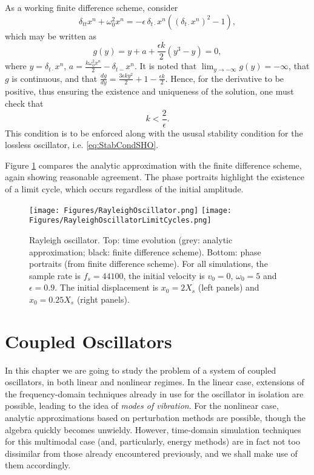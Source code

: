\documentclass[11pt,twoside,a4paper,english]{book}
\newcommand{\dtm}{\delta_{t-}}
\newcommand{\dtd}{\delta_{t\cdot}}
\newcommand{\dtt}{\delta_{tt}}
\begin{document}
As a working finite difference scheme, consider 
\begin{equation}
\dtt x^n + \omega_0^2 x^n = -\epsilon \, \dtd x^n \left((\dtd x^n)^2 - 1 \right),
\end{equation}
 which may be written as 
 \begin{equation}
 g(y) = y + a + \frac{\epsilon k}{2}\left( y^3 - y\right) = 0,
 \end{equation}
where $y = \dtd x^n$, $a = \frac{k\omega_0^2 x^n}{2}-\dtm x^n$. It is noted that $\lim_{y \rightarrow -\infty} g(y) = -\infty$, that $g$ is continuous, and that $\frac{dg}{dy} = \frac{3\epsilon k y^2}{2} + 1 - \frac{\epsilon k}{2}$. Hence, for the derivative to be positive, thus ensuring the existence and uniqueness of the solution, one must check that
\begin{equation}
k < \frac{2}{\epsilon}.
\end{equation}
This condition is to be enforced along with the ususal stability condition for the lossless oscillator, i.e. \eqref{eq:StabCondSHO}. 

Figure \ref{fig:Rayleigh} compares the analytic approximation with the finite difference scheme, again showing reasonable agreement. The phase portraits highlight the existence of a limit cycle, which occurs regardless of the initial amplitude. 

\begin{figure}
\texttt{[image: Figures/RayleighOscillator.png]}
\texttt{[image: Figures/RayleighOscillatorLimitCycles.png]}
\caption{Rayleigh oscillator. Top: time evolution (grey: analytic approximation; black: finite difference scheme). Bottom: phase portraits (from finite difference scheme). For all simulations, the sample rate is $f_s=44100$, the initial velocity is $v_0=0$, $\omega_0 = 5$ and $\epsilon = 0.9$. The initial displacement is $x_0 = 2 X_s$ (left panels) and $x_0 = 0.25 X_s$ (right panels).}\label{fig:Rayleigh}
\end{figure}









\chapter{Coupled Oscillators}

In this chapter we are going to study the problem of a system of coupled oscillators, in both linear and nonlinear regimes. In the linear case, extensions of the frequency-domain techniques already in use for the oscillator in isolation are possible, leading to the idea of \emph{modes of vibration}. For the nonlinear case, analytic approximations based on perturbation methods are possible, though the algebra quickly becomes unwieldy. However, time-domain simulation techniques for this multimodal case (and, particularly, energy methods) are in fact not too dissimilar from those already encountered previously, and we shall make use of them accordingly. 
\end{document}
